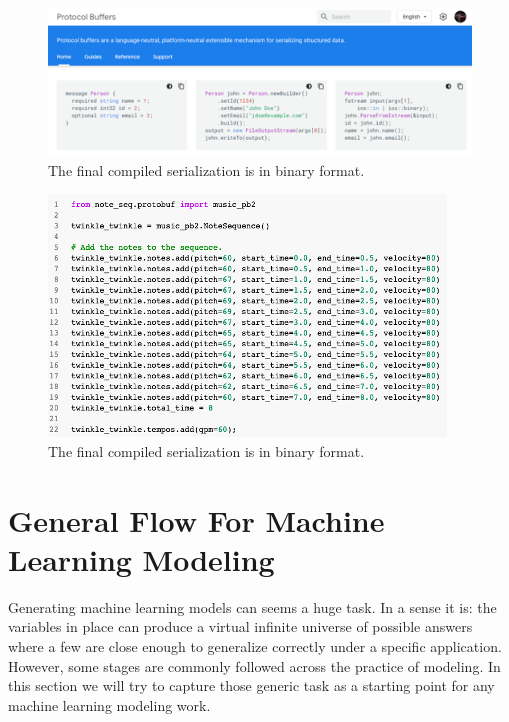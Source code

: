 \begin{figure}[h!]
    \caption{The final compiled serialization is in binary format.}
    \includegraphics[width=\linewidth]{image/fig_JDF31.png}
\end{figure}

\begin{figure}[h!]
    \caption{The final compiled serialization is in binary format.}
    \includegraphics[width=\linewidth]{image/fig_JDF32.png}
\end{figure}

\section{General Flow For Machine Learning Modeling}

Generating machine learning models can seems a huge task. In a sense it is: the variables
in place can produce a virtual infinite universe of possible answers where a few are close
enough to generalize correctly under a specific application. However, some stages are
commonly followed across the practice of modeling. In this section we will try to capture
those generic task as a starting point for any machine learning modeling work.

